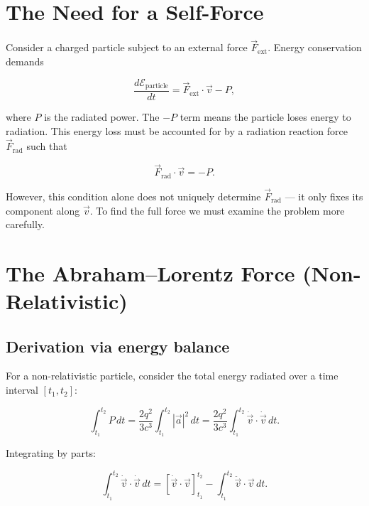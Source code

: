 \section{The Need for a Self-Force}

Consider a charged particle subject to an external force $\vec{F}_{\text{ext}}$. Energy conservation demands

\begin{equation}
\frac{d\mathcal{E}_{\text{particle}}}{dt} = \vec{F}_{\text{ext}}\cdot\vec{v} - P,
\end{equation}

where $P$ is the radiated power. The $-P$ term means the particle loses energy to radiation. This energy loss must be accounted for by a radiation reaction force $\vec{F}_{\text{rad}}$ such that

\begin{equation}
\vec{F}_{\text{rad}}\cdot\vec{v} = -P.
\end{equation}

However, this condition alone does not uniquely determine $\vec{F}_{\text{rad}}$ --- it only fixes its component along $\vec{v}$. To find the full force we must examine the problem more carefully.

\section{The Abraham--Lorentz Force (Non-Relativistic)}

\subsection{Derivation via energy balance}

For a non-relativistic particle, consider the total energy radiated over a time interval $[t_1, t_2]$:

\begin{equation}
\int_{t_1}^{t_2} P\,dt = \frac{2q^2}{3c^3}\int_{t_1}^{t_2} |\vec{a}|^2\,dt = \frac{2q^2}{3c^3}\int_{t_1}^{t_2} \dot{\vec{v}}\cdot\dot{\vec{v}}\,dt.
\end{equation}

Integrating by parts:

\begin{equation}
\int_{t_1}^{t_2} \dot{\vec{v}}\cdot\dot{\vec{v}}\,dt = \left[\dot{\vec{v}}\cdot\vec{v}\right]_{t_1}^{t_2} - \int_{t_1}^{t_2} \ddot{\vec{v}}\cdot\vec{v}\,dt.
\end{equation}

